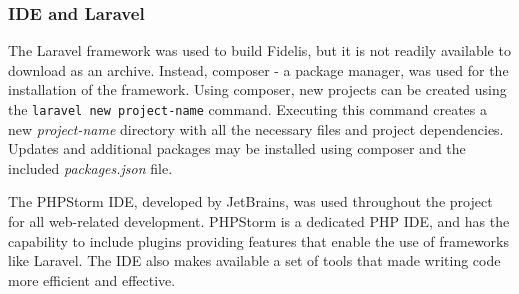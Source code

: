 \subsubsection{IDE and Laravel}
The Laravel framework was used to build Fidelis, but it is not readily available to download as an archive. Instead, composer - a package manager, was used for the installation of the framework. Using composer, new projects can be created using the \texttt{laravel new project-name} command. Executing this command creates a new \textit{project-name} directory with all the necessary files and project dependencies. Updates and additional packages may be installed using composer and the included \textit{packages.json} file.

The PHPStorm IDE, developed by JetBrains, was used throughout the project for all web-related development. PHPStorm is a dedicated PHP IDE, and has the capability to include plugins providing features that enable the use of frameworks like Laravel. The IDE also makes available a set of tools that made writing code more efficient and effective.